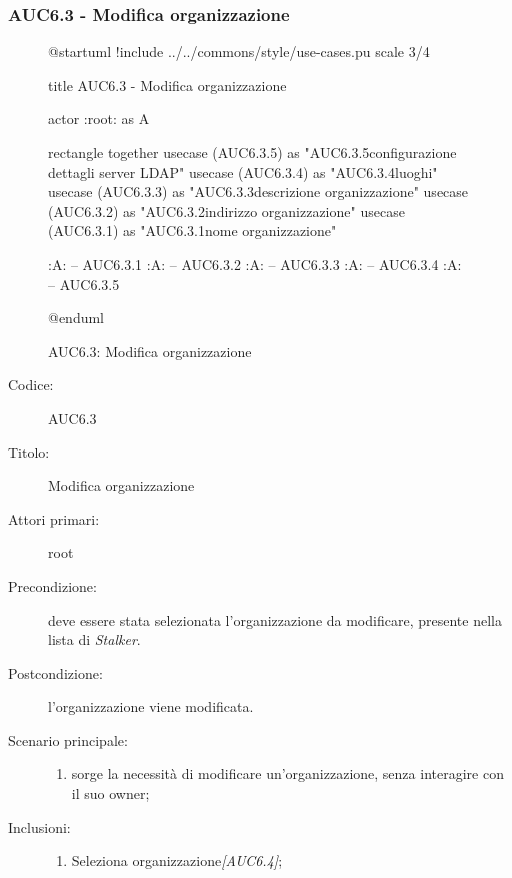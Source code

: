 \documentclass[casi-duso]{subfiles}
\begin{document}
\subsubsection{AUC6.3 - Modifica organizzazione}%
\label{subsub:AUC6.3}

\begin{figure}[h!] 
  \centering 
  \begin{plantuml}
  @startuml
  !include ../../commons/style/use-cases.pu
  scale 3/4

  title AUC6.3 - Modifica organizzazione

  actor :root: as A

  rectangle {
    together {
      usecase (AUC6.3.5) as "AUC6.3.5\nModifica configurazione dettagli server LDAP"
      usecase (AUC6.3.4) as "AUC6.3.4\nGestione luoghi"
      usecase (AUC6.3.3) as "AUC6.3.3\nModifica descrizione organizzazione"
      usecase (AUC6.3.2) as "AUC6.3.2\nModifica indirizzo organizzazione"
      usecase (AUC6.3.1) as "AUC6.3.1\nModifica nome organizzazione" 
    }
  }

  :A: -- AUC6.3.1
  :A: -- AUC6.3.2
  :A: -- AUC6.3.3
  :A: -- AUC6.3.4
  :A: -- AUC6.3.5

  @enduml
  \end{plantuml} 
  \caption{AUC6.3: Modifica organizzazione} 
  \label{fig:auc6_3} 
\end{figure}

\begin{description}
  \item[Codice:] AUC6.3
  \item[Titolo:] Modifica organizzazione
  \item[Attori primari:] root
  \item[Precondizione:] deve essere stata selezionata l'organizzazione da modificare, presente nella lista di \emph{Stalker}.
  \item[Postcondizione:] l'organizzazione viene modificata.
  \item[Scenario principale:]
  \begin{enumerate}
    \item sorge la necessità di modificare un'organizzazione, senza interagire con il suo owner;
  \end{enumerate}
  \item[Inclusioni:]
  \begin{enumerate}
    \item Seleziona organizzazione\emph{[AUC6.4]};
  \end{enumerate}
\end{description}
\end{document}
